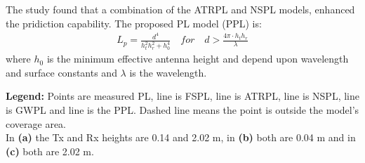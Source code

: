 \large

\begin{minipage}{.45\textwidth}
The study found that a combination of the ATRPL and NSPL models, enhanced the pridiction capability. The proposed PL model (PPL) is:
\vspace{-0.5em}\begin{align*}
L_p = \frac{d^4}{h_t^2 h_r^2+h_0^4}\quad for \quad d > \frac{4\pi\cdot h_th_r}{\lambda}
\end{align*}
where $h_0$ is the minimum effective antenna height and depend upon wavelength and surface constants and $\lambda$ is the wavelength.


\end{minipage}%
\hspace{1cm}
\begin{minipage}{0.45\textwidth}
\begin{center}

\end{center}
\end{minipage}

\vspace{0.5em}
\begin{minipage}{0.5\textwidth}
\begin{center}

\end{center}
\end{minipage}
\begin{minipage}{0.5\textwidth}
\begin{center}

\end{center}
\end{minipage}

\vspace{0.5em}
\textbf{Legend:} \textcolor{thomasblue}{Points} are measured PL, \textcolor{thomasred}{line} is FSPL, \textcolor{thomasyellow}{line} is ATRPL, \textcolor{thomasgreen}{line} is NSPL, \textcolor{thomaspurple}{line} is GWPL and line is the PPL. Dashed line means the point is outside the model's coverage area.\\
In \textbf{(a)} the Tx and Rx heights are 0.14 and 2.02 m, in \textbf{(b)} both are 0.04 m and in \textbf{(c)} both are 2.02 m.
